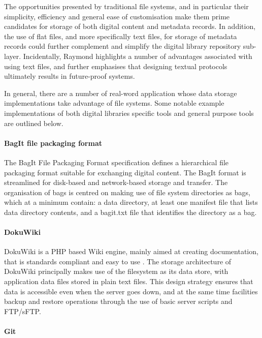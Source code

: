 The opportunities presented by traditional file systems, and in particular their
simplicity, efficiency and general ease of customisation make them prime
candidates for storage of both digital content and metadata records. In
addition, the use of flat files, and more specifically text files, for storage
of metadata records could further complement and simplify the digital
library repository sub-layer. Incidentally, Raymond \citep[see][chap.
5]{Raymond2004,} highlights a number of advantages associated with using text
files, and further emphasises that designing textual protocols ultimately
results in future-proof systems.

In general, there are a number of real-word application whose data storage
implementations take advantage of file systems. Some notable example
implementations of both digital libraries specific tools and general purpose
tools are outlined below.

\paragraph{BagIt file packaging format}

The BagIt File Packaging Format specification \citep{Boyko2012} defines a
hierarchical file packaging format suitable for exchanging digital content. The
BagIt format is streamlined for disk-based and network-based storage and
transfer. The organisation of bags is centred on making use of file system
directories as bags, which at a minimum contain: a data directory, at least one
manifest file that lists data directory contents, and a bagit.txt file that
identifies the directory as a bag.

\paragraph{DokuWiki}

DokuWiki is a PHP based Wiki engine, mainly aimed at creating documentation, that is standards compliant and easy to use \citep{DokuWiki}. The storage architecture of DokuWiki principally makes use of the filesystem as its data store, with application data files stored in plain text files. This design strategy ensures that data is accessible even when the server goes down, and at the same time facilities backup and restore operations through the use of basic server scripts and FTP/sFTP.

\paragraph{Git}

